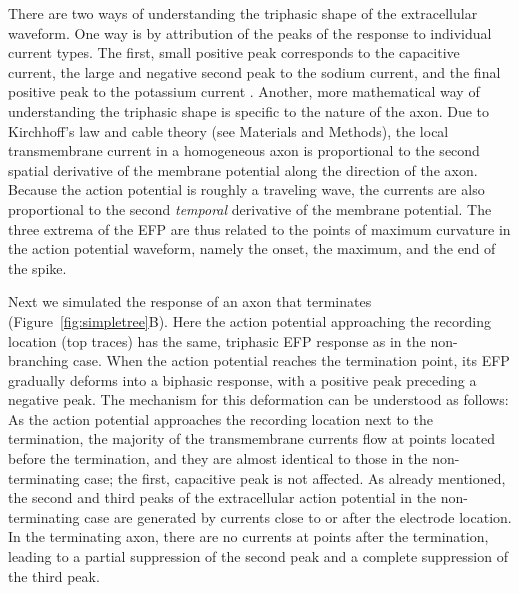 \documentclass[]{elife}
\begin{document}
There are two ways of understanding the triphasic shape of the
extracellular waveform. One way is by attribution of the peaks of the
response to individual current types. The first, small positive peak
corresponds to the capacitive current, the large and negative second
peak to the sodium current, and the final positive peak to the potassium
current \citep{Gold2006Origin}. Another, more mathematical way of
understanding the triphasic shape is specific to the nature of the axon.
Due to Kirchhoff's law and cable theory (see Materials and Methods), the
local transmembrane current in a homogeneous axon is proportional to the
second spatial derivative of the membrane potential along the direction
of the axon. Because the action potential is roughly a traveling wave,
the currents are also proportional to the second \emph{temporal}
derivative of the membrane potential. The three extrema of the EFP are
thus related to the points of maximum curvature in the action potential
waveform, namely the onset, the maximum, and the end of the spike.

Next we simulated the response of an axon that terminates
(Figure~\ref{fig:simpletree}B). Here the action potential approaching
the recording location (top traces) has the same, triphasic EFP response
as in the non-branching case. When the action potential reaches the
termination point, its EFP gradually deforms into a biphasic response,
with a positive peak preceding a negative peak. The mechanism for this
deformation can be understood as follows: As the action potential
approaches the recording location next to the termination, the majority
of the transmembrane currents flow at points located before the
termination, and they are almost identical to those in the
non-terminating case; the first, capacitive peak is not affected. As
already mentioned, the second and third peaks of the extracellular
action potential in the non-terminating case are generated by currents
close to or after the electrode location. In the terminating axon, there
are no currents at points after the termination, leading to a partial
suppression of the second peak and a complete suppression of the third
peak.
\end{document}
